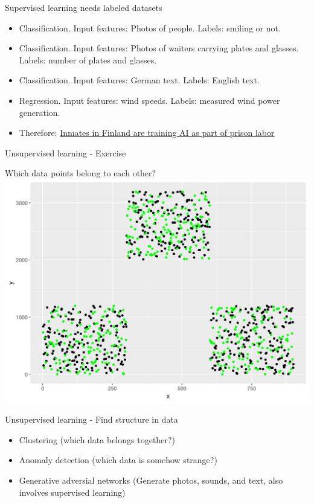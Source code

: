 \documentclass[color=usenames,dvipsnames]{beamer}
\begin{document}
\begin{frame}{Supervised learning needs labeled datasets} 

\begin{itemize}
\item Classification. Input features: Photos of people. Labels: smiling or not.
\item Classification. Input features: Photos of waiters carrying plates and glasses. Labels: number of plates and glasses.
\item Classification. Input features: German text. Labels: English text.
\item Regression. Input features: wind speeds. Labels: measured wind power generation.
\item Therefore: 
\href{https://www.theverge.com/2019/3/28/18285572/prison-labor-finland-artificial-intelligence-data-tagging-vainu}{{Inmates in Finland are training AI as part of prison labor}}
\end{itemize}

\end{frame}


\begin{frame}{Unsupervised learning - Exercise} 

\begin{center}
Which data points belong to each other?\\
\includegraphics[width=0.8\linewidth]{../figures/clustering.png}
\end{center}


\end{frame}

\begin{frame}{Unsupervised learning - Find structure in data} 

\begin{itemize}
\item Clustering (which data belongs together?)
\item Anomaly detection (which data is somehow strange?)
\item Generative adversial networks (Generate photos, sounds, and text, also involves supervised learning)
\end{itemize}

\end{frame}
\end{document}
